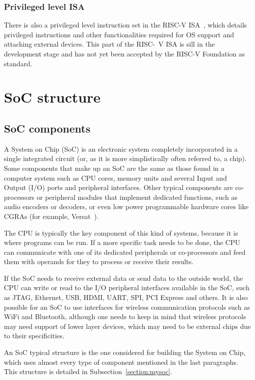 \subsubsection{Privileged level ISA}
There is also a privileged level instruction set in the RISC-V
ISA~\cite{bib:riscvprivileged110}, which details privileged instructions and
other functionalities required for OS support and attaching external
devices. This part of the RISC-~V ISA is sill in the development stage and has
not yet been accepted by the RISC-V Foundation as standard.

\section{SoC structure}
\label{section:socdesign}

\subsection{SoC components}
A System on Chip (SoC) is an electronic system completely incorporated in a
single integrated circuit (or, as it is more simplistically often referred to, a
chip). Some components that make up an SoC are the same as those found in a
computer system such as CPU cores, memory units and several Input and Output
(I/O) ports and peripheral interfaces. Other typical components are
co-processors or peripheral modules that implement dedicated functions, such as
audio encoders or decoders, or even low power programmable hardware cores like
CGRAs (for example, Versat~\cite{bib:versat}).

The CPU is typically the key component of this kind of systems, because it is
where programs can be run. If a more specific task needs to be done, the CPU can
communicate with one of its dedicated peripherals or co-processors and feed them
with operands for they to process or receive their results.

If the SoC needs to receive external data or send data to the outside world, the
CPU can write or read to the I/O peripheral interfaces available in the SoC,
such as JTAG, Ethernet, USB, HDMI, UART, SPI, PCI Express and others. It is also
possible for an SoC to use interfaces for wireless communication protocols such
as WiFi and Bluetooth, although one needs to keep in mind that wireless
protocols may need support of lower layer devices, which may need to be external
chips due to their specificities.

An SoC typical structure is the one considered for building the \socname System
on Chip, which uses almost every type of component mentioned in the last
paragraphs. This structure is detailed in Subsection~\ref{section:mysoc}.

